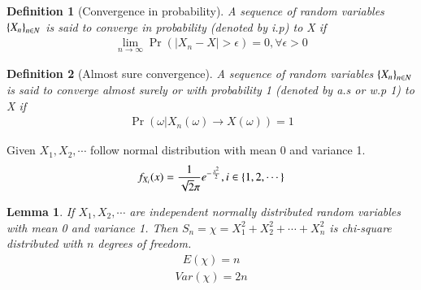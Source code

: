 \documentclass[journal,12pt,twocolumn]{IEEEtran}
\newtheorem{definition}{Definition}[section]
\newtheorem{lemma}[theorem]{Lemma}
\begin{document}
\begin{definition}[Convergence in probability]
A sequence of random variables $\left\{X_n\right\}_{n\in N}$ is said to converge in probability (denoted by i.p) to X if
\begin{align}
    \lim_{n \to \infty} \Pr(\left| X_{n}-X\right|>\epsilon)=0 ,\forall \epsilon>0
\end{align}\label{in prob}
\end{definition}

\begin{definition}[Almost sure convergence]
A sequence of random variables $\left\{X_n\right\}_{n\in N}$ is said to converge almost surely or with probability 1 (denoted by a.s or w.p 1) to X if \label{with prob 1}
\begin{align}
    \Pr(\omega |X_n(\omega) \to X(\omega))=1
\end{align}
\end{definition}







 Given $X_1,X_2, \cdots$ follow normal distribution with mean 0 and variance 1.
\begin{align}
    f_{X_i}(x)=\frac{1}{\sqrt{2}\pi}e^{-\frac{x^2}{2}} ,i \in \left\{1,2,\cdots\right\}
\end{align}
\begin{lemma}
If $X_1,X_2,\cdots$ are independent normally distributed random variables with mean 0 and variance 1. Then $S_{n}=\chi=X_{1}^2+X_{2}^2+\cdots+X_{n}^2$ is chi-square distributed with $n$ degrees of freedom.
\begin{align}
    E(\chi)=n \label{eq:x2}
\end{align}
\begin{align}
    Var(\chi)=2n\label{eq:x10}
\end{align}\label{lem}
\end{lemma}
\end{document}
